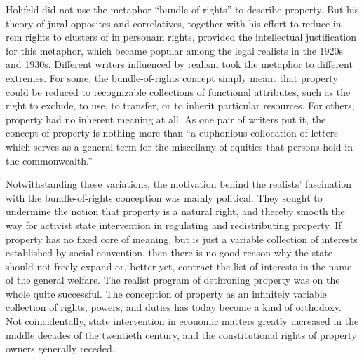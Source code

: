 Hohfeld did not use the metaphor ``bundle of rights'' to describe property. But
his theory of jural opposites and correlatives, together with his effort to
reduce in rem rights to clusters of in personam rights, provided the
intellectual justification for this metaphor, which became popular among the
legal realists in the 1920s and 1930s.  Different writers influenced by realism
took the metaphor to different extremes. For some, the bundle-of-rights concept
simply meant that property could be reduced to recognizable collections of
functional attributes, such as the right to exclude, to use, to transfer, or to
inherit particular resources. For others, property had no inherent meaning at
all. As one pair of writers put it, the concept of property is nothing more
than ``a euphonious collocation of letters which serves as a general term for
the miscellany of equities that persons hold in the
commonwealth.''

Notwithstanding these variations, the motivation behind the realists'
fascination with the bundle-of-rights conception was mainly political. They
sought to undermine the notion that property is a natural right, and thereby
smooth the way for activist state intervention in regulating and redistributing
property. If property has no fixed core of meaning, but is just a variable
collection of interests established by social convention, then there is no good
reason why the state should not freely expand or, better yet, contract the list
of interests in the name of the general welfare. The realist program of
dethroning property was on the whole quite successful. The conception of
property as an infinitely variable collection of rights, powers, and duties has
today become a kind of orthodoxy. Not coincidentally, state intervention in
economic matters greatly increased in the middle decades of the twentieth
century, and the constitutional rights of property owners generally receded.

